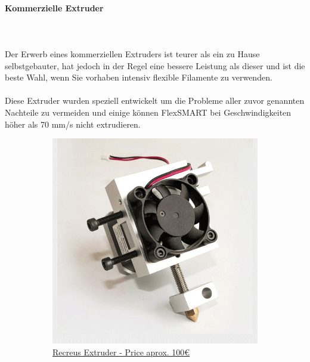 \documentclass[11pt,a4paper]{article}
\begin{document}
			\paragraph{Kommerzielle Extruder}\mbox{}\\\\
Der Erwerb eines kommerziellen Extruders ist teurer als ein zu Hause selbstgebauter, hat jedoch in der Regel eine bessere Leistung als dieser und ist die beste Wahl, wenn Sie vorhaben intensiv flexible Filamente zu verwenden.
\\\\
Diese Extruder wurden speziell entwickelt um die Probleme aller zuvor genannten Nachteile zu vermeiden und einige können FlexSMART bei Geschwindigkeiten höher als 70 mm/s nicht extrudieren.
\begin{figure}[H]
    \centering
    \begin{subfigure}[b]{0.4\textwidth}
        \includegraphics[width=\textwidth,cfbox=azul_marcos 4pt 0pt]{FOTOS/EXTRUSOR5}
		\caption*{\href{http://www.recreus.com}{{\footnotesize Recreus Extruder - Price aprox. 100\euro}}}
    \end{subfigure}
    ~ \qquad%
    \begin{subfigure}[b]{0.4\textwidth}

\end{subfigure}
\end{figure}
\end{document}
